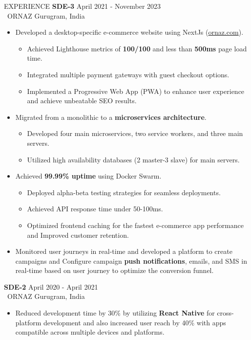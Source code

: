 \documentclass{resume} %
\begin{document}
\begin{rSection}{EXPERIENCE}
	\textbf{SDE-3} \hfill April 2021 - November 2023\\
	\ ORNAZ \hfill Gurugram, India
	\begin{itemize}
		\itemsep -5pt {}
		\item Developed a desktop-specific e-commerce website using NextJs (\href{https://www.ornaz.com}{ornaz.com}).
		      \begin{itemize}
		      	\itemsep -5pt {}
		      	\item Achieved Lighthouse metrics of \textbf{100/100} and less than \textbf{500ms} page load time.
		      	\item Integrated multiple payment gateways with guest checkout options.
		      	\item Implemented a Progressive Web App (PWA) to enhance user experience and achieve unbeatable SEO results.
		      \end{itemize}
		\item Migrated from a monolithic to a \textbf{microservices architecture}.
		      \begin{itemize}
		      	\itemsep -5pt {}
		      	\item Developed four main microservices, two service workers, and three main servers.
		      	\item Utilized high availability databases (2 master-3 slave) for main servers.
		      \end{itemize}
		\item Achieved \textbf{99.99\% uptime} using Docker Swarm.
		      \begin{itemize}
		      	\itemsep -5pt {}
		      	\item Deployed alpha-beta testing strategies for seamless deployments.
		      	\item Achieved API response time under 50-100ms.
		      	\item Optimized frontend caching for the fastest e-commerce app performance and Improved customer retention.
		      \end{itemize}
		\item Monitored user journeys in real-time and developed a platform to create campaigns and Configure campaign \textbf{push notifications}, emails, and SMS in real-time based on user journey to optimize the conversion funnel.
	\end{itemize}
	
	\textbf{SDE-2} \hfill April 2020 - April 2021 \\
	\ ORNAZ \hfill Gurugram, India
	\begin{itemize}
		\itemsep -5pt {}
		\item Reduced development time by 30\% by utilizing \textbf{React Native} for cross-platform 
		      development and also increased user reach by 40\% with apps compatible across multiple devices and platforms.
		        

\end{itemize}
\end{rSection}
\end{document}
